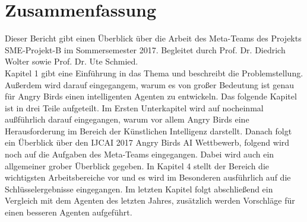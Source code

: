 \section{Zusammenfassung}
Dieser Bericht gibt einen Überblick über die Arbeit des Meta-Teams des Projekts SME-Projekt-B im Sommersemester 2017. Begleitet durch Prof. Dr. Diedrich Wolter sowie Prof. Dr. Ute Schmied.\\
Kapitel 1 gibt eine Einführung in das Thema und beschreibt die Problemstellung. Außerdem wird darauf eingegangem, warum es von großer Bedeutung ist genau für Angry Birds einen intelligenten Agenten zu entwickeln. Das folgende Kapitel ist in drei Teile aufgeteilt. Im Ersten Unterkapitel wird auf nocheinmal außführlich darauf eingegangen, warum vor allem Angry Birds eine Herausforderung im Bereich der Künstlichen Intelligenz darstellt. Danach folgt ein Überblick über den IJCAI 2017 Angry Birds AI Wettbewerb, folgend wird noch auf die Aufgaben des Meta-Teams eingegangen. Dabei wird auch ein allgemeiner grober Überblick gegeben.
In Kapitel 4 stellt der Bereich die wichtigsten Arbeitsbereiche vor und es wird im Besonderen ausführlich auf die Schlüsselergebnisse eingegangen.
Im letzten Kapitel folgt abschließend ein Vergleich mit dem Agenten des letzten Jahres, zusätzlich werden Vorschläge für einen besseren Agenten aufgeführt.
